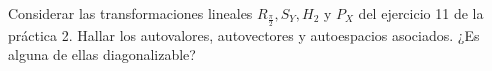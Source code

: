 \item Considerar las transformaciones lineales $R_\frac{\pi}{2},S_Y,H_2$ y $P_X$ del ejercicio 11 de la práctica 2. Hallar los autovalores, autovectores y autoespacios asociados. ¿Es alguna de ellas diagonalizable?
    \begin{mdframed}[style=s]
        
    \end{mdframed}